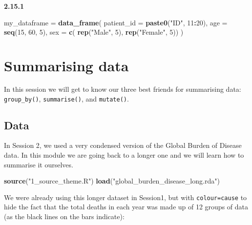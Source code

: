 \documentclass[]{book}
\makeatletter
\newenvironment{Shaded}{\begin{snugshade}}{\end{snugshade}}
\newcommand{\DataTypeTok}[1]{\textcolor[rgb]{0.13,0.29,0.53}{#1}}
\newcommand{\DecValTok}[1]{\textcolor[rgb]{0.00,0.00,0.81}{#1}}
\newcommand{\KeywordTok}[1]{\textcolor[rgb]{0.13,0.29,0.53}{\textbf{#1}}}
\newcommand{\NormalTok}[1]{#1}
\newcommand{\OperatorTok}[1]{\textcolor[rgb]{0.81,0.36,0.00}{\textbf{#1}}}
\newcommand{\StringTok}[1]{\textcolor[rgb]{0.31,0.60,0.02}{#1}}
\newenvironment{kframe}{%
\medskip{}
\setlength{\fboxsep}{.8em}
 \def\at@end@of@kframe{}%
 \ifinner\ifhmode%
  \def\at@end@of@kframe{\end{minipage}}%
  \begin{minipage}{\columnwidth}%
 \fi\fi%
 \def\FrameCommand##1{\hskip\@totalleftmargin \hskip-\fboxsep
 \colorbox{shadecolor}{##1}\hskip-\fboxsep
     \hskip-\linewidth \hskip-\@totalleftmargin \hskip\columnwidth}%
 \MakeFramed {\advance\hsize-\width
   \@totalleftmargin\z@ \linewidth\hsize
   \@setminipage}}%
 {\par\unskip\endMakeFramed%
 \at@end@of@kframe}
\renewenvironment{Shaded}{\begin{kframe}}{\end{kframe}}
\theoremstyle{definition}
\theoremstyle{definition}
\theoremstyle{definition}
\theoremstyle{remark}
\makeatother
\begin{document}
\textbf{2.15.1}

\begin{Shaded}
\begin{Highlighting}[]
\NormalTok{my_dataframe =}\StringTok{ }\KeywordTok{data_frame}\NormalTok{(}
  \DataTypeTok{patient_id =} \KeywordTok{paste0}\NormalTok{(}\StringTok{"ID"}\NormalTok{, }\DecValTok{11}\OperatorTok{:}\DecValTok{20}\NormalTok{),}
  \DataTypeTok{age        =} \KeywordTok{seq}\NormalTok{(}\DecValTok{15}\NormalTok{, }\DecValTok{60}\NormalTok{, }\DecValTok{5}\NormalTok{),}
  \DataTypeTok{sex        =} \KeywordTok{c}\NormalTok{( }\KeywordTok{rep}\NormalTok{(}\StringTok{"Male"}\NormalTok{, }\DecValTok{5}\NormalTok{), }\KeywordTok{rep}\NormalTok{(}\StringTok{"Female"}\NormalTok{, }\DecValTok{5}\NormalTok{))}
\NormalTok{)}
\end{Highlighting}
\end{Shaded}

\hypertarget{summarising-data}{%
\chapter{Summarising data}\label{summarising-data}}

In this session we will get to know our three best friends for
summarising data: \texttt{group\_by()}, \texttt{summarise()}, and
\texttt{mutate()}.

\hypertarget{data-1}{%
\section{Data}\label{data-1}}

In Session 2, we used a very condensed version of the Global Burden of
Disease data. In this module we are going back to a longer one and we
will learn how to summarise it ourselves.

\begin{Shaded}
\begin{Highlighting}[]
\KeywordTok{source}\NormalTok{(}\StringTok{"1_source_theme.R"}\NormalTok{)}
\KeywordTok{load}\NormalTok{(}\StringTok{"global_burden_disease_long.rda"}\NormalTok{)}
\end{Highlighting}
\end{Shaded}

We were already using this longer dataset in Session1, but with
\texttt{colour=cause} to hide the fact that the total deaths in each
year was made up of 12 groups of data (as the black lines on the bars
indicate):

\begin{Shaded}
\end{Shaded}
\end{document}

